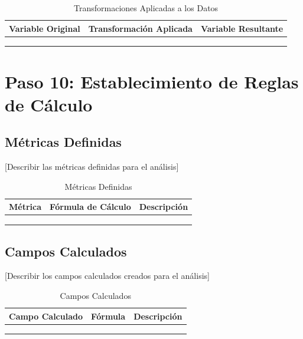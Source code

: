 \documentclass[12pt,letterpaper]{report}
\begin{document}
\begin{table}[H]
    \centering
    \begin{tabularx}{\textwidth}{|X|X|X|}
        \hline
        \textbf{Variable Original} & \textbf{Transformación Aplicada} & \textbf{Variable Resultante} \\
        \hline
        & & \\
        \hline
        & & \\
        \hline
        & & \\
        \hline
    \end{tabularx}
    \caption{Transformaciones Aplicadas a los Datos}
\end{table}

\section{Paso 10: Establecimiento de Reglas de Cálculo}

\subsection{Métricas Definidas}
[Describir las métricas definidas para el análisis]

\begin{table}[H]
    \centering
    \begin{tabularx}{\textwidth}{|X|X|X|}
        \hline
        \textbf{Métrica} & \textbf{Fórmula de Cálculo} & \textbf{Descripción} \\
        \hline
        & & \\
        \hline
        & & \\
        \hline
        & & \\
        \hline
    \end{tabularx}
    \caption{Métricas Definidas}
\end{table}

\subsection{Campos Calculados}
[Describir los campos calculados creados para el análisis]

\begin{table}[H]
    \centering
    \begin{tabularx}{\textwidth}{|X|X|X|}
        \hline
        \textbf{Campo Calculado} & \textbf{Fórmula} & \textbf{Descripción} \\
        \hline
        & & \\
        \hline
        & & \\
        \hline
        & & \\
        \hline
    \end{tabularx}
    \caption{Campos Calculados}
\end{table}
\end{document}
